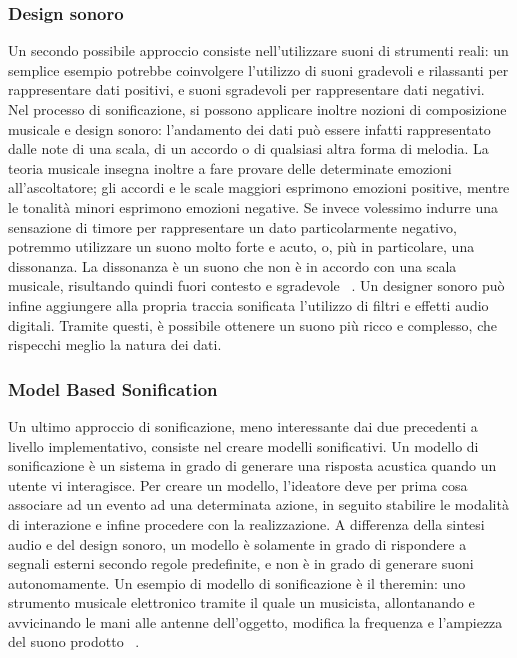 \subsubsection{Design sonoro}
Un secondo possibile approccio consiste nell'utilizzare suoni di strumenti reali: un semplice esempio potrebbe coinvolgere l'utilizzo di suoni gradevoli e rilassanti per rappresentare dati positivi, e suoni sgradevoli per rappresentare dati negativi.
\\ Nel processo di sonificazione, si possono applicare inoltre nozioni di composizione musicale e design sonoro: l'andamento dei dati può essere infatti rappresentato dalle note di una scala, di un accordo o di qualsiasi altra forma di melodia.
La teoria musicale insegna inoltre a fare provare delle determinate emozioni all'ascoltatore; gli accordi e le scale maggiori esprimono emozioni positive, mentre le tonalità minori esprimono emozioni negative.
Se invece volessimo indurre una sensazione di timore per rappresentare un dato particolarmente negativo, potremmo utilizzare un suono molto forte e acuto, o, più in particolare, una dissonanza.
La dissonanza è un suono che non è in accordo con una scala musicale, risultando quindi fuori contesto e sgradevole ~\cite{dissonance}.
Un designer sonoro può infine aggiungere alla propria traccia sonificata l'utilizzo di filtri e effetti audio digitali.
Tramite questi, è possibile ottenere un suono più ricco e complesso, che rispecchi meglio la natura dei dati.

\subsubsection{Model Based Sonification}
Un ultimo approccio di sonificazione, meno interessante dai due precedenti a livello implementativo, consiste nel creare modelli sonificativi.
Un modello di sonificazione è un sistema in grado di generare una risposta acustica quando un utente vi interagisce.
Per creare un modello, l'ideatore deve per prima cosa associare ad un evento ad una determinata azione, in seguito stabilire le modalità di interazione e infine procedere con la realizzazione.
A differenza della sintesi audio e del design sonoro, un modello è solamente in grado di rispondere a segnali esterni secondo regole predefinite, e non è in grado di generare suoni autonomamente.
Un esempio di modello di sonificazione è il theremin: uno strumento musicale elettronico tramite il quale un musicista, allontanando e avvicinando le mani alle antenne dell'oggetto, modifica la frequenza e l'ampiezza del suono prodotto ~\cite{sonification_model}.


